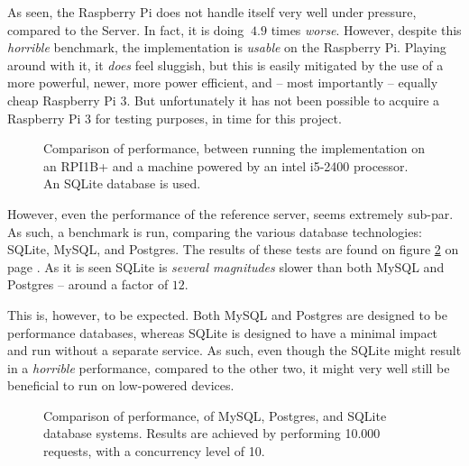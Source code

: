 	As seen, the Raspberry Pi does not handle itself very well under pressure, compared to the Server. In fact, it is doing $~4.9$ times \emph{worse}. However, despite this \emph{horrible} benchmark, the implementation is \emph{usable} on the Raspberry Pi. Playing around with it, it \emph{does} feel sluggish, but this is easily mitigated by the use of a more powerful, newer, more power efficient, and -- most importantly -- equally cheap Raspberry Pi 3. But unfortunately it has not been possible to acquire a Raspberry Pi 3 for testing purposes, in time for this project.

	\begin{figure}[!h]
		\centering
	    \caption{Comparison of performance, between running the implementation on an RPI1B+ and a machine powered by an intel i5-2400 processor. An SQLite database is used.}
	    \label{fig:bench:arch}
	\end{figure}

	However, even the performance of the reference server, seems extremely sub-par. As such, a benchmark is run, comparing the various database technologies: SQLite, MySQL, and Postgres. The results of these tests are found on figure \ref{fig:bench:db} on page \pageref{fig:bench:db}. As it is seen SQLite is \emph{several magnitudes} slower than both MySQL and Postgres -- around a factor of $12$.

	This is, however, to be expected. Both MySQL and Postgres are designed to be performance databases, whereas SQLite is designed to have a minimal impact and run without a separate service. As such, even though the SQLite might result in a \emph{horrible} performance, compared to the other two, it might very well still be beneficial to run on low-powered devices.

	\begin{figure}[!h]
		\centering
	    \caption{Comparison of performance, of MySQL, Postgres, and SQLite database systems. Results are achieved by performing 10.000 requests, with a concurrency level of 10.}
	    \label{fig:bench:db}
	\end{figure}


